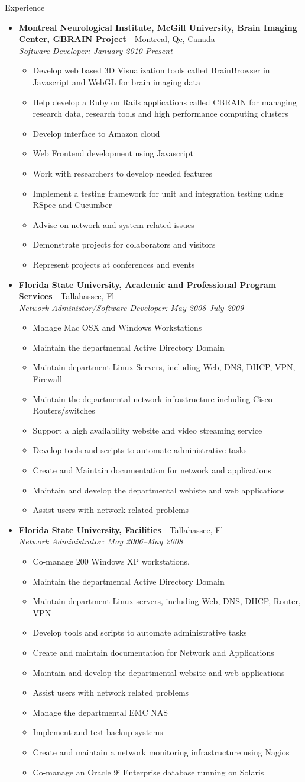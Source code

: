 \documentclass[11pt,oneside]{article}
\newenvironment{ressection}[1]{
	\vspace{4pt}
	{\fontfamily{phv}\selectfont\Large#1}
	\begin{itemize}
	\vspace{3pt}
}{
	\end{itemize}
}
\newcommand{\ressubitem}[1]{
	\vspace{-1pt}
	\item \begin{flushleft} #1 \end{flushleft}
}
\newcommand{\resbigitem}[3]{
	\vspace{-5pt}
	\item
	\textbf{#1}---#2 \\
	\textit{#3}
}
\newenvironment{ressubsec}[3]{
	\resbigitem{#1}{#2}{#3}
	\vspace{-2pt}
	\begin{itemize}
}{
	\end{itemize}
}
\begin{document}
\begin{ressection}{Experience}
  
    \begin{ressubsec}{Montreal Neurological Institute, McGill University, Brain Imaging Center, GBRAIN Project}{Montreal, Qc, Canada}{Software Developer: January 2010-Present}
      \ressubitem {Develop web based 3D Visualization tools called BrainBrowser in Javascript and WebGL for brain imaging data}
      \ressubitem {Help develop a  Ruby on Rails applications called CBRAIN for managing research data, research tools and high performance computing clusters}
      \ressubitem {Develop interface to Amazon cloud}
      \ressubitem {Web Frontend development using Javascript} 
      \ressubitem {Work with researchers to develop needed features}
      \ressubitem {Implement a testing framework for unit and integration testing using RSpec and Cucumber}
      \ressubitem {Advise on network and system related issues}
      \ressubitem {Demonstrate projects for colaborators and visitors}
      \ressubitem {Represent projects at conferences and events}
    \end{ressubsec}

  \begin{ressubsec}{Florida State University, Academic and Professional Program Services}{Tallahassee, Fl}{Network Administor/Software Developer: May 2008-July 2009}
    \ressubitem{Manage Mac OSX and Windows Workstations}
    \ressubitem{Maintain the departmental Active Directory Domain}
    \ressubitem{Maintain department Linux Servers, including Web, DNS, DHCP, VPN, Firewall}
    \ressubitem{Maintain the departmental network infrastructure including Cisco Routers/switches}
    \ressubitem{Support a high availability website and video streaming service}
    \ressubitem{Develop tools and scripts to automate administrative tasks}
    \ressubitem{Create and Maintain documentation for network and applications}
    \ressubitem{Maintain and develop the departmental webiste and web applications}
    \ressubitem{Assist users with network related problems}
  \end{ressubsec}

	\begin{ressubsec}{Florida State University, Facilities}{Tallahassee, Fl}
{Network Administrator: May 2006--May 2008}
	  \ressubitem{Co-manage 200  Windows XP workstations.}
	  \ressubitem{Maintain the departmental Active Directory Domain}
          \ressubitem{Maintain department Linux servers, including Web, DNS, DHCP, Router, VPN}
	  \ressubitem{Develop tools and scripts to automate administrative tasks}
	  \ressubitem{Create and maintain documentation for Network and Applications}
	  \ressubitem{Maintain and develop the departmental website and web applications}
	  \ressubitem{Assist users with network related problems}
	  \ressubitem{Manage the departmental EMC NAS}
	  \ressubitem{Implement and test backup systems} 
	  \ressubitem{Create and maintain a network monitoring infrastructure using Nagios}
          \ressubitem{Co-manage an Oracle 9i Enterprise database running on Solaris}
	\end{ressubsec}
\end{ressection}
\end{document}
